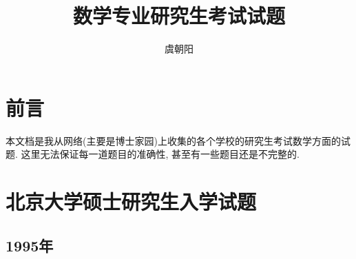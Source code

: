\documentclass[12pt,a4paper,openany]{book}
\title{数学专业研究生考试试题}
\author{虞朝阳}
\begin{document}
\renewcommand{\contentsname}{目\quad{}录}
\renewcommand{\chaptername}{}

\renewcommand{\chaptername}{第~\thechapter~章}

\titleformat{\chapter}[hang]{\centering\LARGE\bfseries}{\chaptername}{1em}{}


\frontmatter
\begin{titlepage}
\maketitle
\end{titlepage}
\setcounter{page}{0}
\chapter{前言}
本文档是我从网络(主要是博士家园)上收集的各个学校的研究生考试数学方面的试题. 这里无法保证每一道题目的准确性, 甚至有一些题目还是不完整的.
\tableofcontents

\mainmatter
\chapter{北京大学硕士研究生入学试题}

\section{1995年}
\end{document}
